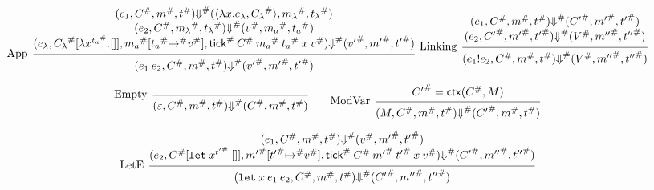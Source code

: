 \documentclass{article}
\theoremstyle{definition}
\newcommand*{\A}[1]{{#1}^{\#}}
\newcommand*{\mem}{m}
\newcommand*{\link}[2]{{#1}\mathtt{!}{#2}}
\newcommand*{\tick}{\mathsf{tick}}
\newcommand*{\modctx}{\mathsf{ctx}}
\begin{document}
\[
  \begin{prooftree}
    \hypo{
      \begin{matrix}
        (e_{1}, \A{C}, \A{\mem}, \A{t})
        \A{\Downarrow}
        (\langle\lambda x.e_{\lambda}, \A{C_{\lambda}}\rangle, \A{\mem_{\lambda}}, \A{t_{\lambda}}) \\
        (e_{2}, \A{C}, \A{\mem_{\lambda}}, \A{t_{\lambda}})
        \A{\Downarrow}
        (\A{v}, \A{\mem_{a}}, \A{t_{a}})                                                            \\
        (e_{\lambda}, \A{C_{\lambda}}[\lambda x^{\A{t_{a}}}.[]], \A{\mem_{a}}[\A{t_{a}}\A{\mapsto} \A{v}], \A{\tick}\:\A{C}\:\A{\mem_a}\:\A{t_{a}}\:x\:\A{v})
        \A{\Downarrow}
        (\A{v'}, \A{\mem'},\A{t'})
      \end{matrix}
    }
    \infer[left label={App}]1{
    (e_{1}\:e_{2}, \A{C}, \A{\mem}, \A{t})
    \A{\Downarrow}
    (\A{v'}, \A{\mem'},\A{t'})
    }
  \end{prooftree}\:\:
  \begin{prooftree}
    \hypo{
      \begin{matrix}
        (e_{1}, \A{C}, \A{\mem}, \A{t})
        \A{\Downarrow}
        (\A{C'}, \A{\mem'}, \A{t'}) \\
        (e_{2}, \A{C'}, \A{\mem'}, \A{t'})
        \A{\Downarrow}
        (\A{V}, \A{\mem''}, \A{t''})
      \end{matrix}
    }
    \infer[left label=Linking]1{
    (\link{e_{1}}{e_{2}}, \A{C}, \A{\mem}, \A{t})
    \A\Downarrow
    (\A{V}, \A{\mem''}, \A{t''})
    }
  \end{prooftree}
\]

\[
  \begin{prooftree}
    \infer[left label=Empty]0{
    (\varepsilon, \A{C}, \A{\mem}, \A{t})
    \A{\Downarrow}
    (\A{C}, \A{\mem}, \A{t})
    }
  \end{prooftree}\qquad
  \begin{prooftree}
    \hypo{\A{C'}=\modctx(\A{C},M)}
    \infer[left label=ModVar]1{
    (M, \A{C}, \A{\mem}, \A{t})
    \A{\Downarrow}
    (\A{C'}, \A{\mem}, \A{t})
    }
  \end{prooftree}
\]

\[
  \begin{prooftree}
    \hypo{
      \begin{matrix}
        (e_{1}, \A{C}, \A{\mem}, \A{t})
        \A\Downarrow
        (\A{v}, \A{\mem'}, \A{t'}) \\
        (e_{2}, \A{C}[\mathtt{let}\:x^{\A{t'}}\:[]], \A{\mem'}[\A{t'}\A{\mapsto} \A{v}], \A{\tick}\:\A{C}\:\A{\mem'}\:\A{t'}\:x\:\A{v})
        \A\Downarrow
        (\A{C'}, \A{\mem''}, \A{t''})
      \end{matrix}
    }
    \infer[left label=LetE]1{
    (\mathtt{let}\:x\:e_1\:e_2, \A{C}, \A{\mem}, \A{t})
    \A\Downarrow
    (\A{C'}, \A{\mem''}, \A{t''})
    }
  \end{prooftree}
\]
\end{document}
